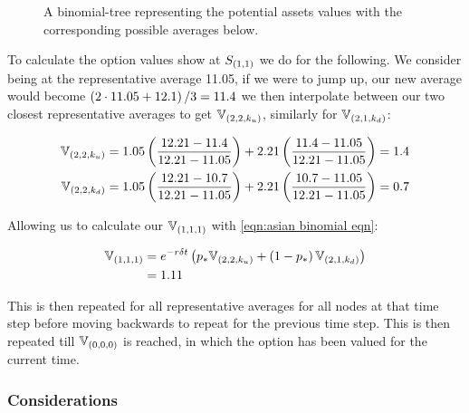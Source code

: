 \begin{figure}[H]
    \centering
    \caption{A binomial-tree representing the potential assets values with the corresponding possible averages below.}
\end{figure}

To calculate the option values show at \(\inc{S}{1}{1}\) we do for the following. We consider being at the representative average 11.05, if we were to jump up, our new average would become \(\p{2\cdot 11.05 + 12.1}/3 = 11.4\) we then interpolate between our two closest representative averages to get \(\inct{\pof}{2}{2}{k_u}\), similarly for \(\inct{\pof}{2}{1}{k_d}\):

\begin{align*}
    \inct{\pof}{2}{2}{k_u} = \intep{11.05}{1.05}{12.21}{2.21}{11.4} &= 1.4 \\
    \inct{\pof}{2}{2}{k_d} = \intep{11.05}{1.05}{12.21}{2.21}{10.7} &= 0.7   
\end{align*} 

Allowing us to calculate our \(\inct{\pof}{1}{1}{1}\) with \autoref{eqn:asian binomial eqn}:

\begin{align*}
    \inct{\pof}{1}{1}{1} &= e^{-r\delta t}\p{p_*\inct{\pof}{2}{2}{k_u} + \p{1-p_*}\inct{\pof}{2}{1}{k_d}} \\
    &= 1.11
\end{align*}

This is then repeated for all representative averages for all nodes at that time step before moving backwards to repeat for the previous time step. This is then repeated till \(\inct{\pof}{0}{0}{0}\) is reached, in which the option has been valued for the current time.

\subsubsection{Considerations}

